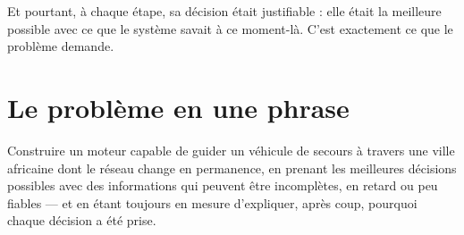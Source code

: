 \documentclass[12pt, a4paper]{article}
\begin{document}
Et pourtant, à chaque étape, sa décision était justifiable : elle était
la meilleure possible avec ce que le système savait à ce moment-là.
C'est exactement ce que le problème demande.


\section{Le problème en une phrase}

\begin{encadre}
Construire un moteur capable de guider un véhicule de secours à travers
une ville africaine dont le réseau change en permanence, en prenant les
meilleures décisions possibles avec des informations qui peuvent être
incomplètes, en retard ou peu fiables — et en étant toujours en mesure
d'expliquer, après coup, pourquoi chaque décision a été prise.
\end{encadre}
\end{document}
